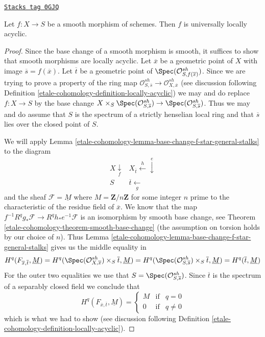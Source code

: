 \begin{proposition}
\label{etale-cohomology-proposition-smooth-locally-acyclic}
\href{https://stacks.math.columbia.edu/tag/0GJQ}{\texttt{Stacks tag 0GJQ}}

Let $f : X \to S$ be a smooth morphism of schemes.
Then $f$ is universally locally acyclic.
\end{proposition}

\begin{proof}
Since the base change of a smooth morphism is smooth, it suffices
to show that smooth morphisms are locally acyclic.
Let $\overline{x}$ be a geometric point of $X$ with image
$\overline{s} = f(\overline{x})$. Let
$\overline{t}$ be a geometric point of
$\Spec(\mathcal{O}^{sh}_{S, f(\overline{x})})$.
Since we are trying to prove a property of the ring map
$\mathcal{O}^{sh}_{S, \overline{s}} \to \mathcal{O}^{sh}_{X, \overline{x}}$
(see discussion following Definition \ref{etale-cohomology-definition-locally-acyclic})
we may and do replace $f : X \to S$ by the base change
$X \times_S \Spec(\mathcal{O}^{sh}_{S, \overline{s}}) \to
\Spec(\mathcal{O}^{sh}_{S, \overline{s}})$.
Thus we may and do assume that $S$ is the spectrum of a strictly
henselian local ring and that $\overline{s}$ lies over
the closed point of $S$.

\medskip\noindent
We will apply Lemma \ref{etale-cohomology-lemma-base-change-f-star-general-stalks}
to the diagram
$$
\begin{array}{cc}X \underset{f}{\downarrow} & X_{\overline{t}} \overset{h}{\longleftarrow}\overset{e}{\downarrow} \\ S & \overline{t} \underset{g}{\longleftarrow}\end{array}
$$
and the sheaf $\mathcal{F} = \underline{M}$ where $M = \mathbf{Z}/n\mathbf{Z}$
for some integer $n$ prime to the characteristic of the residue field of
$\overline{x}$. We know that the map
$f^{-1}R^qg_*\mathcal{F} \to R^qh_*e^{-1}\mathcal{F}$
is an isomorphism by smooth base change, see
Theorem \ref{etale-cohomology-theorem-smooth-base-change} (the assumption
on torsion holds by our choice of $n$).
Thus Lemma \ref{etale-cohomology-lemma-base-change-f-star-general-stalks}
gives us the middle equality in
$$
H^q(F_{\overline{x}, \overline{t}}, \underline{M}) =
H^q(\Spec(\mathcal{O}^{sh}_{X, \overline{x}}) \times_S \overline{t},
\underline{M})
=
H^q(\Spec(\mathcal{O}^{sh}_{S, \overline{s}}) \times_S \overline{t},
\underline{M}) =
H^q(\overline{t}, \underline{M})
$$
For the outer two equalities we use that
$S = \Spec(\mathcal{O}^{sh}_{S, \overline{s}})$.
Since $\overline{t}$ is the spectrum of a separably
closed field we conclude that
$$
H^q(F_{\overline{x}, \overline{t}}, \underline{M}) =
\left\{
\begin{matrix}
M & \text{if} & q = 0 \\
0 & \text{if} & q \not = 0
\end{matrix}
\right.
$$
which is what we had to show (see discussion following
Definition \ref{etale-cohomology-definition-locally-acyclic}).
\end{proof}

